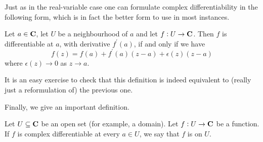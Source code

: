 Just as in the real-variable case one can formulate complex differentiability in the following form, which is in fact the better form to use in most instances.

\begin{lemma}
Let $a\in\mathbf C$, let $U$ be a neighbourhood of $a$ and let $f:U\to\mathbf C$. Then $f$ is differentiable at $a$, with derivative $f^\prime(a)$, if and only if we have
\begin{equation}
f(z)=f(a)+f^\prime(a)(z-a)+\epsilon(z)(z-a)
\end{equation}
where $\epsilon(z)\to0$ as $z\to a$.
\end{lemma}

It is an easy exercise to check that this definition is indeed equivalent to (really just a reformulation of) the previous one.

Finally, we give an important definition.

\begin{definition}
Let $U\subseteq\mathbf C$ be an open set (for example, a domain). Let $f:U\to\mathbf C$ be a function. If $f$ is complex differentiable at every $a\in U$, we say that $f$ is  on $U$.
\end{definition}

\begin{comment}
\begin{definition}[Continuity]
$f:\Omega\to\CC$ for $\Omega\subset\CC$ open is \vocab{continuous} at $z_0$ if $\displaystyle\lim_{z\to z_0}=f(z_0)$.
\end{definition}

\begin{proposition}
$f$ is continuous if and only if $f$ is continuous at all $a\in\Omega$.
\end{proposition}

\begin{proposition}
If $f,g:\Omega\to\CC$ are continuous, then so are $f+g$, $fg$ and $f/g$ (where the last one is defined over $\Omega\setminus\{x\mid g(x)=0\}$).
\end{proposition}

\begin{proposition}
An analytic function is continuous.
\end{proposition}

\begin{proof}
Suppose $f:\Omega\to\CC$ is analytic with derivative 
\[f^\prime(z)=\lim_{h\to0}\frac{f(z+h)-f(z)}{h}.\]
Then
\[\lim_{h\to0}\brac{f(z+h)-f(z)}=f^\prime(z)\lim_{h\to0}h=0.\]
\end{proof}
\end{comment}

